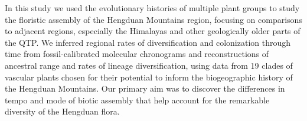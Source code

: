 


In this study we used the evolutionary histories of multiple plant
groups to study the floristic assembly of the Hengduan Mountains
region, focusing on comparisons to adjacent regions, especially the
Himalayas and other geologically older parts of the QTP. We inferred
regional rates of diversification and colonization through time from
fossil-calibrated molecular chronograms and reconstructions of
ancestral range and rates of lineage diversification, using data from
19 clades of vascular plants chosen for their potential to inform the
biogeographic history of the Hengduan Mountains. Our primary aim was
to discover the differences in tempo and mode of biotic assembly that
help account for the remarkable diversity of the Hengduan flora.


